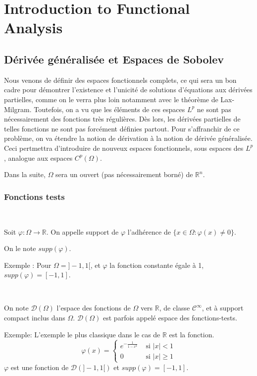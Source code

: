 \chapter{Introduction to Functional Analysis}
\section{Dérivée généralisée et Espaces de Sobolev}
Nous venons de définir des espaces fonctionnels complets, ce qui sera un bon cadre pour démontrer l'existence et l'unicité de solutions d'équations aux dérivées partielles, comme on le verra plus loin notamment avec le théorème de Lax-Milgram. Toutefois, on a vu que les éléments de ces espaces $L^{p}$ ne sont pas nécessairement des fonctions très régulières. Dès lors, les dérivées partielles de telles fonctions ne sont pas forcément définies partout. Pour s'affranchir de ce problème, on va étendre la notion de dérivation à  la notion  de dérivée généralisée.  Ceci  pertmettra d'introduire de nouveux espaces fonctionnels, sous espaces des $L^p$, analogue aux espaces $C^p(\Omega)$.  

Dans la suite, $\Omega$ sera un ouvert (pas nécessairement borné) de $\mathbb{R}^{n}$.

\subsection{Fonctions tests} 

\begin{definition}\
	
	
	Soit $\varphi: \Omega \rightarrow \mathbb{R}$. On appelle support de $\varphi$ l'adhérence de $\{x \in \Omega :  \varphi(x) \neq 0\}$. 
	
	On le note $supp(\varphi)$. 
	\end{definition}
Exemple : Pour $\Omega=]-1,1[$, et $\varphi$ la fonction constante égale à 1, $supp(\varphi)=[-1,1]$.

\begin{definition}\
	
On note $\mathcal{D}(\Omega)$ l'espace des fonctions de $\Omega$ vers $\mathbb{R}$, de classe $\mathcal{C}^{\infty}$, et à support
compact inclus dans $\Omega.$  $ \mathcal{D}(\Omega)$ est parfois appelé espace des fonctions-tests.

\end{definition}

Exemple: L'exemple le plus classique dans le cas de $\mathbb{R}$ est la fonction.
$$
\varphi(x)= \begin{cases}e^{-\frac{1}{1-x^{2}}} & \text { si }|x|<1 \\ 0 & \text { si }|x| \geq 1\end{cases}
$$
$\varphi$ est une fonction de $\mathcal{D}( ]-1, 1[ )$  et $supp(\varphi)=[-1,1]$.

